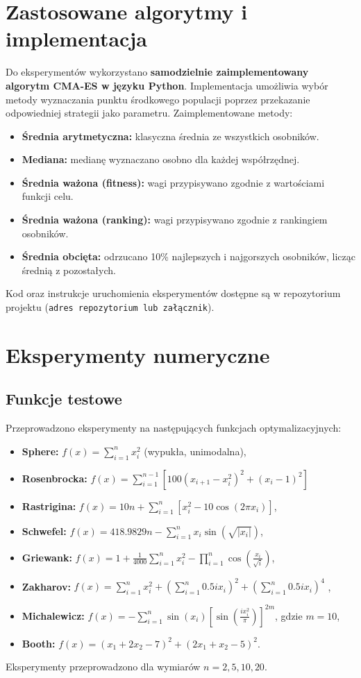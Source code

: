 \documentclass{article}
\begin{document}
\section{Zastosowane algorytmy i implementacja}
Do eksperymentów wykorzystano \textbf{samodzielnie zaimplementowany algorytm CMA-ES w języku Python}. Implementacja umożliwia wybór metody wyznaczania punktu środkowego populacji poprzez przekazanie odpowiedniej strategii jako parametru. Zaimplementowane metody:
\begin{itemize}
    \item \textbf{Średnia arytmetyczna:} klasyczna średnia ze wszystkich osobników.
    \item \textbf{Mediana:} medianę wyznaczano osobno dla każdej współrzędnej.
    \item \textbf{Średnia ważona (fitness):} wagi przypisywano zgodnie z wartościami funkcji celu.
    \item \textbf{Średnia ważona (ranking):} wagi przypisywano zgodnie z rankingiem osobników.
    \item \textbf{Średnia obcięta:} odrzucano 10\% najlepszych i najgorszych osobników, licząc średnią z pozostałych.
\end{itemize}
Kod oraz instrukcje uruchomienia eksperymentów dostępne są w repozytorium projektu (\texttt{adres repozytorium lub załącznik}).

\section{Eksperymenty numeryczne}
\subsection{Funkcje testowe}
Przeprowadzono eksperymenty na następujących funkcjach optymalizacyjnych:
\begin{itemize}
    \item \textbf{Sphere:} $f(x) = \sum_{i=1}^n x_i^2$ (wypukła, unimodalna),
    \item \textbf{Rosenbrocka:} $f(x) = \sum_{i=1}^{n-1} [100(x_{i+1} - x_i^2)^2 + (x_i - 1)^2]$ 
    \item \textbf{Rastrigina:} $f(x) = 10n + \sum_{i=1}^n [x_i^2 - 10\cos(2\pi x_i)]$,
    \item \textbf{Schwefel:} $f(x) = 418.9829n - \sum_{i=1}^n x_i \sin(\sqrt{|x_i|})$,
    \item \textbf{Griewank:} $f(x) = 1 + \frac{1}{4000}\sum_{i=1}^n x_i^2 - \prod_{i=1}^n \cos\left(\frac{x_i}{\sqrt{i}}\right)$,
    \item \textbf{Zakharov:} $f(x) = \sum_{i=1}^n x_i^2 + \left(\sum_{i=1}^n 0.5 i x_i\right)^2 + \left(\sum_{i=1}^n 0.5 i x_i\right)^4$ ,
    \item \textbf{Michalewicz:} $f(x) = -\sum_{i=1}^n \sin(x_i) \left[\sin\left(\frac{i x_i^2}{\pi}\right)\right]^{2m}$, gdzie $m=10$,
    \item \textbf{Booth:} $f(x) = (x_1 + 2x_2 - 7)^2 + (2x_1 + x_2 - 5)^2$.
\end{itemize}
Eksperymenty przeprowadzono dla wymiarów $n=2, 5, 10, 20$.
\end{document}
